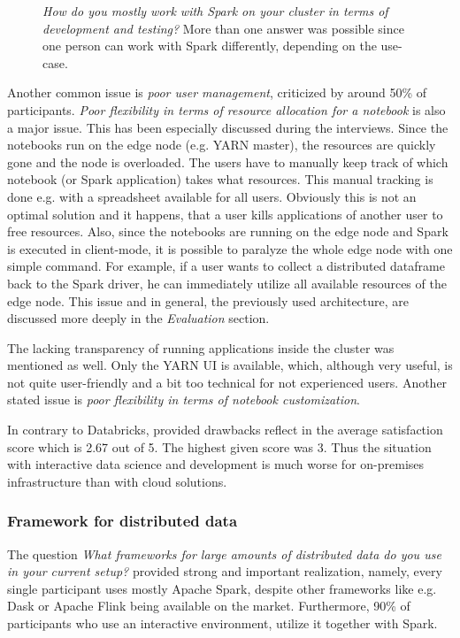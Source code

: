 \documentclass[a4paper,twoside]{article}
\begin{document}
\begin{figure*}[!h]
  \centering
   {}
  \caption{\textit{How do you mostly work with Spark on your cluster in terms of development and testing?} More than one answer was possible since one person can work with Spark differently, depending on the use-case.}
  \label{fig:re_how_spark}
\end{figure*}

Another common issue is \textit{poor user management}, criticized by around 50\% of participants.  \textit{Poor flexibility in terms of resource allocation for a notebook} is also a major issue. This has been especially discussed during the interviews. Since the notebooks run on the edge node (e.g. YARN master), the resources are quickly gone and the node is overloaded. The users have to manually keep track of which notebook (or Spark application) takes what resources. This manual tracking is done e.g. with a spreadsheet available for all users. Obviously this is not an optimal solution and it happens, that a user kills applications of another user to free resources. Also, since the notebooks are running on the edge node and Spark is executed in client-mode, it is possible to paralyze the whole edge node with one simple command. For example, if a user wants to collect a distributed dataframe back to the Spark driver, he can immediately utilize all available resources of the edge node. This issue and in general, the previously used architecture, are discussed more deeply in the \textit{Evaluation} section.

The lacking transparency of running applications inside the cluster was mentioned as well. Only the YARN UI is available, which, although very useful, is not quite user-friendly and a bit too technical for not experienced users. Another stated issue is \textit{poor flexibility in terms of notebook customization}.

In contrary to Databricks, provided drawbacks reflect in the average satisfaction score which is 2.67 out of 5. The highest given score was 3. Thus the situation with interactive data science and development is much worse for on-premises infrastructure than with cloud solutions.

\subsubsection{Framework for distributed data}

The question \textit{What frameworks for large amounts of distributed data do you use in your current setup?} provided strong and important realization, namely, every single participant uses mostly Apache Spark, despite other frameworks like e.g. Dask or Apache Flink being available on the market. Furthermore, 90\% of participants who use an interactive environment, utilize it together with Spark.
\end{document}
